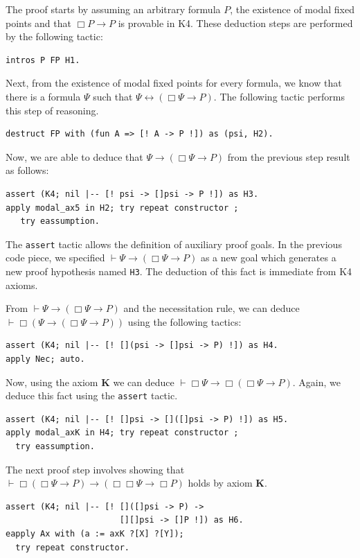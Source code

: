 \documentclass[sigconf]{acmart}
\begin{document}
The proof starts by assuming an arbitrary formula $P$, the existence of modal fixed
points and that $\Box P \to P$ is provable in K4. These deduction steps
are performed by the following tactic:
\begin{verbatim}
intros P FP H1.
\end{verbatim}

Next, from the existence of modal fixed points for every formula,
we know that there is a formula $\Psi$ such that $\Psi \leftrightarrow (\Box
\Psi \to P)$. The following tactic performs this step of reasoning.
\begin{verbatim}
destruct FP with (fun A => [! A -> P !]) as (psi, H2).
\end{verbatim}
Now, we are able to deduce that $\Psi \to (\Box \Psi\to P)$ from the previous
step result as follows:
\begin{verbatim}
assert (K4; nil |-- [! psi -> []psi -> P !]) as H3.
apply modal_ax5 in H2; try repeat constructor ;
   try eassumption.
\end{verbatim}
The \texttt{assert} tactic allows the definition of
auxiliary proof goals. In the previous code piece, we specified
$\vdash \Psi \to (\Box \Psi \to P)$ as a new goal which
generates a new proof hypothesis named \texttt{H3}. The
deduction of this fact is immediate from K4 axioms.

From $\vdash \Psi \to (\Box \Psi \to P)$ and the necessitation
rule, we can deduce $\vdash \Box (\Psi \to (\Box \Psi \to P))$
using the following tactics:
\begin{verbatim}
assert (K4; nil |-- [! [](psi -> []psi -> P) !]) as H4.
apply Nec; auto.
\end{verbatim}

Now, using the axiom \textbf{K} we can deduce $\vdash \Box \Psi \to
\Box (\Box \Psi \to P)$. Again, we deduce this fact using the
\texttt{assert} tactic.
\begin{verbatim}
assert (K4; nil |-- [! []psi -> []([]psi -> P) !]) as H5.
apply modal_axK in H4; try repeat constructor ;
  try eassumption.
\end{verbatim}

The next proof step involves showing that
$\vdash \Box (\Box \Psi \to P)\to (\Box \Box \Psi \to \Box P)$ holds
by axiom \textbf{K}.
\begin{verbatim}
assert (K4; nil |-- [! []([]psi -> P) ->
                       [][]psi -> []P !]) as H6.
eapply Ax with (a := axK ?[X] ?[Y]);
  try repeat constructor.
\end{verbatim}
\end{document}
